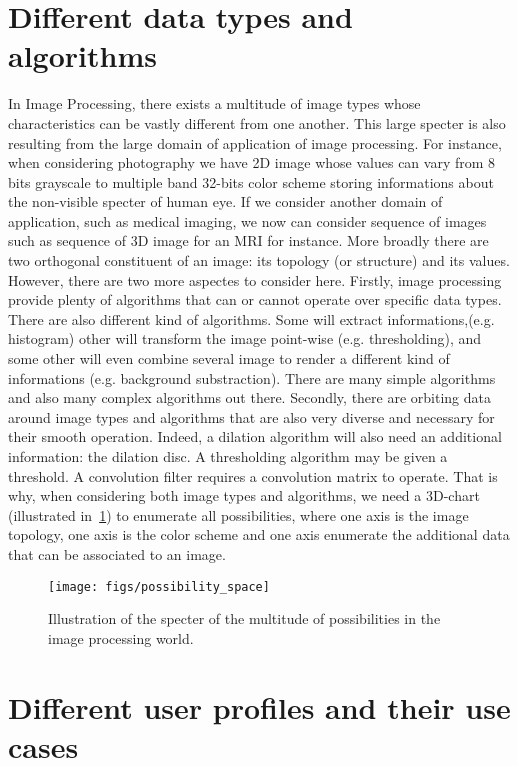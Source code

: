 \section*{Different data types and algorithms}

In Image Processing, there exists a multitude of image types whose characteristics can be vastly different from one
another. This large specter is also resulting from the large domain of application of image processing. For instance,
when considering photography we have 2D image whose values can vary from 8 bits grayscale to multiple band 32-bits color
scheme storing informations about the non-visible specter of human eye. If we consider another domain of application,
such as medical imaging, we now can consider sequence of images such as sequence of 3D image for an MRI for instance.
More broadly there are two orthogonal constituent of an image: its topology (or structure) and its values. However,
there are two more aspectes to consider here. Firstly, image processing provide plenty of algorithms that can or cannot
operate over specific data types. There are also different kind of algorithms. Some will extract informations,(e.g.
histogram) other will transform the image point-wise (e.g. thresholding), and some other will even combine several image
to render a different kind of informations (e.g. background substraction). There are many simple algorithms and also
many complex algorithms out there. Secondly, there are orbiting data around image types and algorithms that are also
very diverse and necessary for their smooth operation. Indeed, a dilation algorithm will also need an additional
information: the dilation disc. A thresholding algorithm may be given a threshold. A convolution filter requires a
convolution matrix to operate. That is why, when considering both image types and algorithms, we need a 3D-chart
(illustrated in~\cref{fig:int.possibility_space}) to enumerate all possibilities, where one axis is the image topology,
one axis is the color scheme and one axis enumerate the additional data that can be associated to an image.


\begin{figure}[tbh]
  \centering
  \texttt{[image: figs/possibility\_space]}
  \caption{Illustration of the specter of the multitude of possibilities in the image processing world.}
  \label{fig:int.possibility_space}
\end{figure}


\section*{Different user profiles and their use cases}


